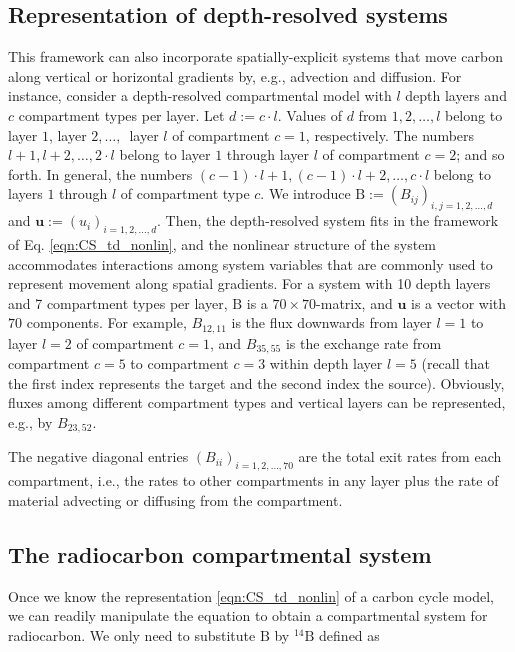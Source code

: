\documentclass[draft]{agujournal2019}
\renewcommand{\vec}[1]{\mathbf{#1}}
\newcommand{\tens}[1]{\mathrm{#1}}
\begin{document}
\subsection{Representation of depth-resolved systems}
    This framework can also incorporate spatially-explicit systems that move carbon along vertical or horizontal gradients by, e.g., advection and diffusion.  For instance, consider a depth-resolved compartmental model with $l$ depth layers and $c$ compartment types per layer.
    Let $d:=c \cdot l$. 
    Values of $d$ from $1,2, \ldots, l$  belong to layer $1$, layer $2$,$\,\ldots,\,$ layer $l$ of compartment $c =  1$, respectively.
    The numbers $l+1,l+2,\ldots,2 \cdot l$ belong to layer $1$ through layer $l$ of compartment $c = 2$; and so forth.
    In general, the numbers $(c-1) \cdot l+1,(c-1) \cdot l+2,\ldots,c \cdot l$ belong to layers $1$ through $l$ of compartment type $c$.
    We introduce $\tens{B}:=(B_{ij})_{i,j=1,2,\ldots,d}$ and $\vec{u}:=(u_i)_{i=1,2,\ldots,d}$.
    Then, the depth-resolved system fits in the framework of Eq. \eqref{eqn:CS_td_nonlin}, and the nonlinear structure of the system accommodates interactions among system variables that are commonly used to represent movement along spatial gradients.
    For a system with 10 depth layers and 7 compartment types per layer, $\tens{B}$ is a $70\times 70$-matrix, and $\vec{u}$ is a vector with $70$ components.
    For example, $B_{12,11}$ is the flux downwards from layer $l = 1$ to layer $l = 2$ of compartment $c = 1$, and $B_{35,55}$ is the exchange rate from compartment $c = 5$  to compartment $c = 3$ within depth layer $l = 5$ (recall that the first index represents the target and the second index the source).
    Obviously,  fluxes among different compartment types and vertical layers can be represented, e.g., by $B_{23,52}$. 
    
    The negative diagonal entries $(B_{ii})_{i=1,2,\ldots,70}$ are the total exit rates from each compartment, i.e., the rates to other compartments  in any layer plus the rate of material advecting or diffusing from the compartment.
    

\subsection{The radiocarbon compartmental system}
    Once we know the representation \eqref{eqn:CS_td_nonlin} of a carbon cycle model, we can readily manipulate the equation to obtain a compartmental system for radiocarbon.
    We only need to substitute $\tens{B}$ by ${}^{14}\tens{B}$ defined as
    
\end{document}
